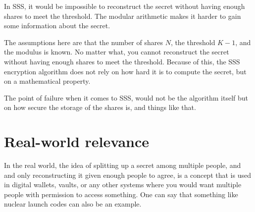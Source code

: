 \documentclass[15pt]{article}
\begin{document}
\begin{flushleft}
In SSS, it would be impossible to reconstruct the secret without having enough
shares to meet the threshold. The modular arithmetic makes it harder to gain
some information about the secret.

The assumptions here are that the number of shares $N$, the threshold $K-1$, and
the modulus is known. No matter what, you cannot reconstruct the secret without
having enough shares to meet the threshold. Because of this, the SSS encryption
algorithm does not rely on how hard it is to compute the secret, but
on a mathematical property.

The point of failure when it comes to SSS, would not be the algorithm itself but
on how secure the storage of the shares is, and things like that.

\section{\textbf{Real-world relevance}}

In the real world, the idea of splitting up a secret among multiple people, and
and only reconstructing it given enough people to agree, is a concept that is
used in digital wallets, vaults, or any other systems where you would want
multiple people with permission to access something. One can say that something
like nuclear launch codes can also be an example.

\end{flushleft}
\end{document}

